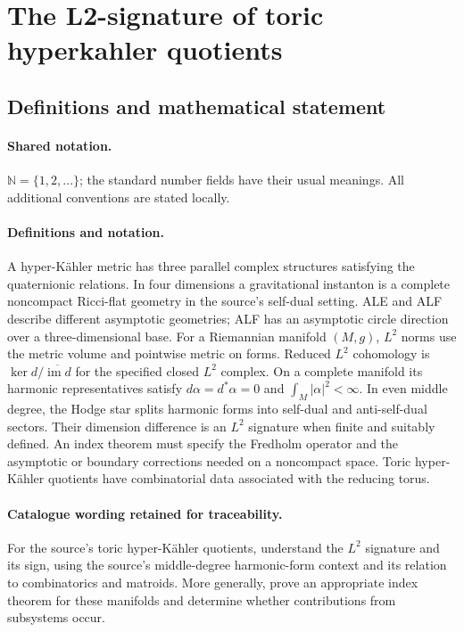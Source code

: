 \documentclass[11pt]{article}
\begin{document}
\section{The L2-signature of toric hyperkahler quotients}\label{statement}

\subsection{Definitions and mathematical statement}

\paragraph{Shared notation.}$\mathbb N=\{1,2,\ldots\}$; the standard number fields have their usual meanings. All additional conventions are stated locally.


\paragraph{Definitions and notation.}A hyper-Kähler metric has three parallel complex structures satisfying the quaternionic relations. In four dimensions a gravitational instanton is a complete noncompact Ricci-flat geometry in the source’s self-dual setting. ALE and ALF describe different asymptotic geometries; ALF has an asymptotic circle direction over a three-dimensional base. For a Riemannian manifold $(M,g)$, $L^2$ norms use the metric volume and pointwise metric on forms. Reduced $L^2$ cohomology is $\ker d/\overline{\operatorname{im}d}$ for the specified closed $L^2$ complex. On a complete manifold its harmonic representatives satisfy $d\alpha=d^*\alpha=0$ and $\int_M|\alpha|^2<\infty$. In even middle degree, the Hodge star splits harmonic forms into self-dual and anti-self-dual sectors. Their dimension difference is an $L^2$ signature when finite and suitably defined. An index theorem must specify the Fredholm operator and the asymptotic or boundary corrections needed on a noncompact space. Toric hyper-Kähler quotients have combinatorial data associated with the reducing torus.

\paragraph{Catalogue wording retained for traceability.}
For the source’s toric hyper-Kähler quotients, understand the $L^2$ signature and its sign, using the source’s middle-degree harmonic-form context and its relation to combinatorics and matroids. More generally, prove an appropriate index theorem for these manifolds and determine whether contributions from subsystems occur.
\end{document}

